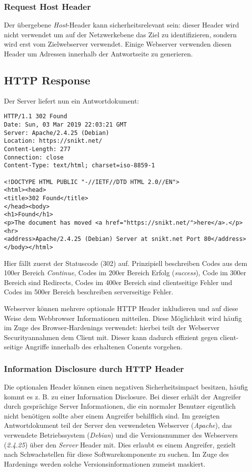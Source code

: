 \subsubsection{Request Host Header}

Der übergebene \textit{Host}-Header kann sicherheitsrelevant sein: dieser Header wird nicht verwendet um auf der Netzwerkebene das Ziel zu identifizieren, sondern wird erst vom Zielwebserver verwendet. Einige Webserver verwenden diesen Header um Adressen innerhalb der Antwortseite zu generieren.

\subsection{HTTP Response}

Der Server liefert nun ein Antwortdokument:

\begin{verbatim}
HTTP/1.1 302 Found
Date: Sun, 03 Mar 2019 22:03:21 GMT
Server: Apache/2.4.25 (Debian)
Location: https://snikt.net/
Content-Length: 277
Connection: close
Content-Type: text/html; charset=iso-8859-1

<!DOCTYPE HTML PUBLIC "-//IETF//DTD HTML 2.0//EN">
<html><head>
<title>302 Found</title>
</head><body>
<h1>Found</h1>
<p>The document has moved <a href="https://snikt.net/">here</a>.</p>
<hr>
<address>Apache/2.4.25 (Debian) Server at snikt.net Port 80</address>
</body></html>
\end{verbatim}

Hier fällt zuerst der Statuscode (302) auf. Prinzipiell beschreiben Codes aus dem 100er Bereich \textit{Continue}, Codes im 200er Bereich Erfolg (\textit{success}), Code im 300er Bereich sind Redirects, Codes im 400er Bereich sind clientseitige Fehler und Codes im 500er Bereich beschreiben serverseitige Fehler.

Webserver können mehrere optionale HTTP Header inkludieren und auf diese Weise dem Webbrowser Informationen mitteilen. Diese Möglichkeit wird häufig im Zuge des Browser-Hardenings verwendet: hierbei teilt der Webserver Securityannahmen dem Client mit. Dieser kann dadurch effizient gegen client-seitige Angriffe innerhalb des erhaltenen Conents vorgehen.

\subsubsection{Information Disclosure durch HTTP Header}

Die optionalen Header können einen negativen Sicherheitsimpact besitzen, häufig kommt es z. B. zu einer Information Disclosure. Bei dieser erhält der Angreifer durch gesprächige Server Informationen, die ein normaler Benutzer eigentlich nicht benötigen sollte aber einem Angreifer behilflich sind. Im gezeigten Antwortdokument teil der Server den verwendeten Webserver (\textit{Apache}), das verwendete Betriebssystem (\textit{Debian}) und die Versionsnummer des Webservers (\textit{2.4.25}) über den \textit{Server} Header mit. Dies erlaubt es einem Angreifer, gezielt nach Schwachstellen für diese Softwarekomponente zu suchen. Im Zuge des Hardenings werden solche Versionsinformationen zumeist maskiert.


